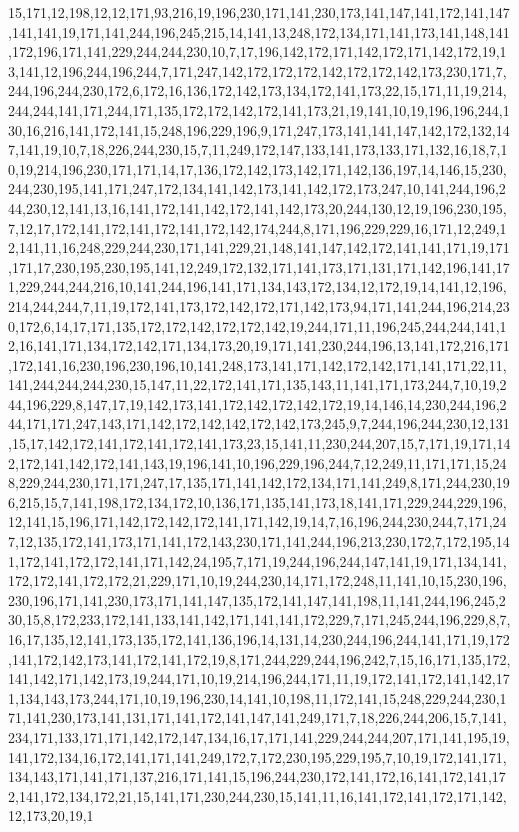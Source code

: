 15,171,12,198,12,12,171,93,216,19,196,230,171,141,230,173,141,147,141,172,141,147,141,141,19,171,141,244,196,245,215,14,141,13,248,172,134,171,141,173,141,148,141,172,196,171,141,229,244,244,230,10,7,17,196,142,172,171,142,172,171,142,172,19,13,141,12,196,244,196,244,7,171,247,142,172,172,172,142,172,172,142,173,230,171,7,244,196,244,230,172,6,172,16,136,172,142,173,134,172,141,173,22,15,171,11,19,214,244,244,141,171,244,171,135,172,172,142,172,141,173,21,19,141,10,19,196,196,244,130,16,216,141,172,141,15,248,196,229,196,9,171,247,173,141,141,147,142,172,132,147,141,19,10,7,18,226,244,230,15,7,11,249,172,147,133,141,173,133,171,132,16,18,7,10,19,214,196,230,171,171,14,17,136,172,142,173,142,171,142,136,197,14,146,15,230,244,230,195,141,171,247,172,134,141,142,173,141,142,172,173,247,10,141,244,196,244,230,12,141,13,16,141,172,141,142,172,141,142,173,20,244,130,12,19,196,230,195,7,12,17,172,141,172,141,172,141,172,142,174,244,8,171,196,229,229,16,171,12,249,12,141,11,16,248,229,244,230,171,141,229,21,148,141,147,142,172,141,141,171,19,171,171,17,230,195,230,195,141,12,249,172,132,171,141,173,171,131,171,142,196,141,171,229,244,244,216,10,141,244,196,141,171,134,143,172,134,12,172,19,14,141,12,196,214,244,244,7,11,19,172,141,173,172,142,172,171,142,173,94,171,141,244,196,214,230,172,6,14,17,171,135,172,172,142,172,172,142,19,244,171,11,196,245,244,244,141,12,16,141,171,134,172,142,171,134,173,20,19,171,141,230,244,196,13,141,172,216,171,172,141,16,230,196,230,196,10,141,248,173,141,171,142,172,142,171,141,171,22,11,141,244,244,244,230,15,147,11,22,172,141,171,135,143,11,141,171,173,244,7,10,19,244,196,229,8,147,17,19,142,173,141,172,142,172,142,172,19,14,146,14,230,244,196,244,171,171,247,143,171,142,172,142,142,172,142,173,245,9,7,244,196,244,230,12,131,15,17,142,172,141,172,141,172,141,173,23,15,141,11,230,244,207,15,7,171,19,171,142,172,141,142,172,141,143,19,196,141,10,196,229,196,244,7,12,249,11,171,171,15,248,229,244,230,171,171,247,17,135,171,141,142,172,134,171,141,249,8,171,244,230,196,215,15,7,141,198,172,134,172,10,136,171,135,141,173,18,141,171,229,244,229,196,12,141,15,196,171,142,172,142,172,141,171,142,19,14,7,16,196,244,230,244,7,171,247,12,135,172,141,173,171,141,172,143,230,171,141,244,196,213,230,172,7,172,195,141,172,141,172,172,141,171,142,24,195,7,171,19,244,196,244,147,141,19,171,134,141,172,172,141,172,172,21,229,171,10,19,244,230,14,171,172,248,11,141,10,15,230,196,230,196,171,141,230,173,171,141,147,135,172,141,147,141,198,11,141,244,196,245,230,15,8,172,233,172,141,133,141,142,171,141,141,172,229,7,171,245,244,196,229,8,7,16,17,135,12,141,173,135,172,141,136,196,14,131,14,230,244,196,244,141,171,19,172,141,172,142,173,141,172,141,172,19,8,171,244,229,244,196,242,7,15,16,171,135,172,141,142,171,142,173,19,244,171,10,19,214,196,244,171,11,19,172,141,172,141,142,171,134,143,173,244,171,10,19,196,230,14,141,10,198,11,172,141,15,248,229,244,230,171,141,230,173,141,131,171,141,172,141,147,141,249,171,7,18,226,244,206,15,7,141,234,171,133,171,171,142,172,147,134,16,17,171,141,229,244,244,207,171,141,195,19,141,172,134,16,172,141,171,141,249,172,7,172,230,195,229,195,7,10,19,172,141,171,134,143,171,141,171,137,216,171,141,15,196,244,230,172,141,172,16,141,172,141,172,141,172,134,172,21,15,141,171,230,244,230,15,141,11,16,141,172,141,172,171,142,12,173,20,19,1